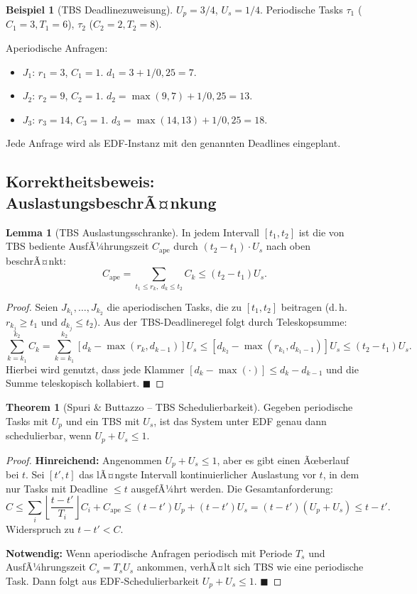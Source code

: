 ﻿\documentclass[a4paper,12pt]{report}
\theoremstyle{definition}
\newtheorem{beispiel}{Beispiel}[chapter]
\newtheorem{lemma}{Lemma}[chapter]
\newtheorem{theorem}{Theorem}[chapter]
\begin{document}
\begin{beispiel}[TBS Deadlinezuweisung]
	$U_p = 3/4$, $U_s = 1/4$. Periodische Tasks $\tau_1$ ($C_1=3, T_1=6$),
	$\tau_2$ ($C_2=2, T_2=8$).

	Aperiodische Anfragen:
	\begin{itemize}
		\item $J_1$: $r_1=3$, $C_1=1$. $d_1 = 3 + 1/0{,}25 = 7$.
		\item $J_2$: $r_2=9$, $C_2=1$. $d_2 = \max(9,7) + 1/0{,}25 = 13$.
		\item $J_3$: $r_3=14$, $C_3=1$. $d_3 = \max(14,13) + 1/0{,}25 = 18$.
	\end{itemize}
	Jede Anfrage wird als EDF-Instanz mit den genannten Deadlines eingeplant.
\end{beispiel}

\subsection{Korrektheitsbeweis: AuslastungsbeschrÃ¤nkung}

\begin{lemma}[TBS Auslastungsschranke]
	\label{lem:tbs_util}
	In jedem Intervall $[t_1, t_2]$ ist die von TBS bediente AusfÃ¼hrungszeit
	$C_{\mathrm{ape}}$ durch $(t_2 - t_1) \cdot U_s$ nach oben beschrÃ¤nkt:
	\[
		C_{\mathrm{ape}} = \sum_{t_1 \leq r_k,\; d_k \leq t_2} C_k \leq (t_2 - t_1) U_s.
	\]
\end{lemma}

\begin{proof}
	Seien $J_{k_1}, \ldots, J_{k_2}$ die aperiodischen Tasks, die zu $[t_1, t_2]$
	beitragen (d.\,h.\ $r_{k_j} \geq t_1$ und $d_{k_j} \leq t_2$). Aus der
	TBS-Deadlineregel folgt durch Teleskopsumme:
	\[
		\sum_{k=k_1}^{k_2} C_k = \sum_{k=k_1}^{k_2} [d_k - \max(r_k, d_{k-1})] U_s
		\leq [d_{k_2} - \max(r_{k_1}, d_{k_1-1})] U_s \leq (t_2 - t_1) U_s.
	\]
	Hierbei wird genutzt, dass jede Klammer $[d_k - \max(\cdot)] \leq d_k - d_{k-1}$
	und die Summe teleskopisch kollabiert. \hfill$\blacksquare$
\end{proof}

\begin{theorem}[Spuri \& Buttazzo -- TBS Schedulierbarkeit]
	\label{thm:tbs}
	Gegeben periodische Tasks mit $U_p$ und ein TBS mit $U_s$, ist das System
	unter EDF genau dann schedulierbar, wenn $U_p + U_s \leq 1$.
\end{theorem}

\begin{proof}
	\textbf{Hinreichend:} Angenommen $U_p + U_s \leq 1$, aber es gibt einen
	Ãœberlauf bei $t$. Sei $[t', t]$ das lÃ¤ngste Intervall kontinuierlicher Auslastung
	vor $t$, in dem nur Tasks mit Deadline $\leq t$ ausgefÃ¼hrt werden. Die Gesamtanforderung:
	\[
		C \leq \sum_i \left\lfloor \frac{t-t'}{T_i} \right\rfloor C_i + C_{\mathrm{ape}}
		\leq (t-t') U_p + (t-t') U_s = (t-t')(U_p + U_s) \leq t-t'.
	\]
	Widerspruch zu $t-t' < C$.

	\textbf{Notwendig:} Wenn aperiodische Anfragen periodisch mit Periode $T_s$
	und AusfÃ¼hrungszeit $C_s = T_s U_s$ ankommen, verhÃ¤lt sich TBS wie eine
	periodische Task. Dann folgt aus EDF-Schedulierbarkeit $U_p + U_s \leq 1$. \hfill$\blacksquare$
\end{proof}
\end{document}
